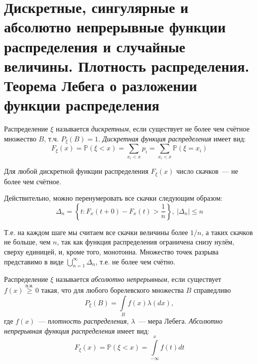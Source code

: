 \section{Дискретные, сингулярные и абсолютно непрерывные функции распределения и случайные величины. Плотность распределения. Теорема Лебега о разложении функции распределения}

\begin{defn}
    Распределение $\xi$ называется \textit{дискретным}, если существует не более чем счётное множество $B$, т.ч. $P_\xi(B) = 1$. 
    \textit{Дискретная функция распределения} имеет вид:
    \begin{equation*}
        F_\xi(x) = \mathbb{P}(\xi < x) = \sum\limits_{x_i < x}{}p_{i} = \sum\limits_{x_i < x}{}\mathbb{P}(\xi = x_{i})
    \end{equation*}
\end{defn}

\begin{rmrk}
    Для любой дискретной функции распределения $F_\xi(x)$ число скачков~--- не более чем счётное.
    
    Действительно, можно перенумеровать все скачки следующим образом:
    \begin{equation*}
        \Delta_{n}=\left\{t \colon F_{x}(t+0)-F_{x}(t)>\frac{1}{n}\right\},~ |\Delta_{n} | \leqslant n
    \end{equation*}
    
    Т.е. на каждом шаге мы считаем все скачки величины более $1 / n$, а таких скачков не больше, чем $n$, так как функция распределения ограничена снизу нулём, сверху единицей, и, кроме того, монотонна.
    Множество точек разрыва представимо в виде $\bigcup\limits_{n = 1}^{\infty} \Delta_{n}$, т.е. не более чем счётно.
\end{rmrk}

\begin{defn}
    Распределение $\xi$ называется \textit{абсолютно непрерывным}, если существует $f(x) \overset{\text{п.н.}}{\geqslant} 0$ такая, что для любого борелевского множества $B$ справедливо
    \begin{equation*}
        P_\xi(B) = \int\limits_B f(x) \lambda(dx),
    \end{equation*}
    где $f(x)$~--- \textit{плотность распределения}, $\lambda$~--- мера Лебега. 
    \textit{Абсолютно непрерывная функция распределения} имеет вид:
    \begin{equation*}
        F_\xi(x) = \mathbb{P}(\xi < x) = \int\limits_{-\infty}^x f(t)dt
    \end{equation*}
\end{defn}

